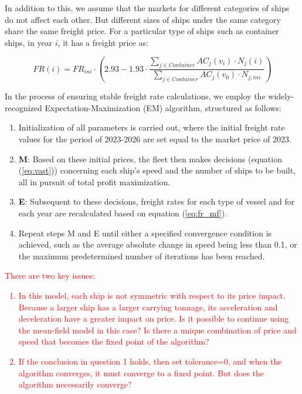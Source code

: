 \documentclass[a4paper,12pt]{article}
\begin{document}
In addition to this, we assume that the markets for different categories of ships do not affect each other.
But different sizes of ships under the same category share the same freight price.
For a particular type of ships such as container ships, in year $i$, it has a freight price as:

\begin{equation}
	\label{eq:fr_mf}
	FR(i) = FR_{ini} \cdot \left (2.93 - 1.93 \cdot \frac{\sum_{j \in Container} AC_j(v_i) \cdot N_j(i)}{\sum_{j \in Container} AC_j(v_0) \cdot N_{j,ini}}\right )
\end{equation}


In the process of ensuring stable freight rate calculations, we employ the widely-recognized Expectation-Maximization (EM) algorithm, structured as follows:

\begin{enumerate}
	\item Initialization of all parameters is carried out, where the initial freight rate values for the period of 2023-2026 are set equal to the market price of 2023.
	\item \textbf{M}: Based on these initial prices, the fleet then makes decisions (equation (\ref{eq:vast})) concerning each ship's speed and the number of ships to be built, all in pursuit of total profit maximization.
	\item \textbf{E}: Subsequent to these decisions, freight rates for each type of vessel and for each year are recalculated based on equation (\ref{eq:fr_mf}).
	\item Repeat steps M and E until either a specified convergence condition is achieved, such as the average absolute change in speed being less than 0.1, or the maximum predetermined number of iterations has been reached.
\end{enumerate}

\textcolor{red}{
	There are two key issues:
	\begin{enumerate}
		\item In this model, each ship is not symmetric with respect to its price impact. Because a larger ship has a larger carrying tonnage, its acceleration and deceleration have a greater impact on price. Is it possible to continue using the mean-field model in this case? Is there a unique combination of price and speed that becomes the fixed point of the algorithm?
		\item If the conclusion in question 1 holds, then set tolerance=0, and when the algorithm converges, it must converge to a fixed point. But does the algorithm necessarily converge?
	\end{enumerate}}
\end{document}
